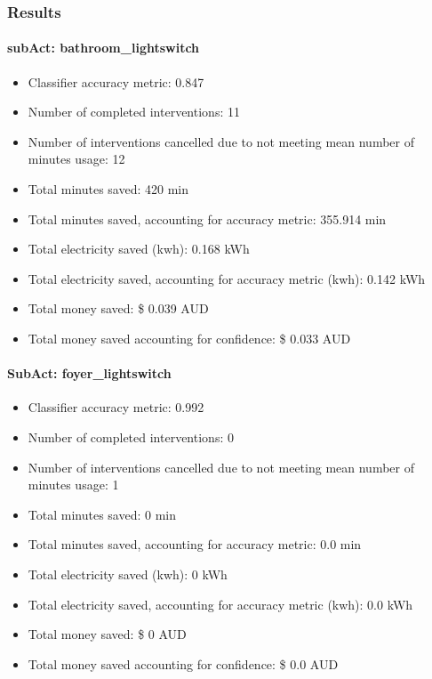 \documentclass[11pt,]{article}
\providecommand{\tightlist}{%
  \setlength{\itemsep}{0pt}\setlength{\parskip}{0pt}}
\let\oldparagraph\paragraph
\renewcommand{\paragraph}[1]{\oldparagraph{#1}\mbox{}}
\begin{document}
\hypertarget{results}{%
\subsubsection{Results}\label{results}}

\hypertarget{subact-bathroom_lightswitch}{%
\paragraph{subAct:
bathroom\_lightswitch}\label{subact-bathroom_lightswitch}}

\begin{itemize}
\tightlist
\item
  Classifier accuracy metric: 0.847
\item
  Number of completed interventions: 11
\item
  Number of interventions cancelled due to not meeting mean number of
  minutes usage: 12
\item
  Total minutes saved: 420 min
\item
  Total minutes saved, accounting for accuracy metric: 355.914 min
\item
  Total electricity saved (kwh): 0.168 kWh
\item
  Total electricity saved, accounting for accuracy metric (kwh): 0.142
  kWh
\item
  Total money saved: \$ 0.039 AUD
\item
  Total money saved accounting for confidence: \$ 0.033 AUD
\end{itemize}

\hypertarget{subact-foyer_lightswitch}{%
\paragraph{SubAct: foyer\_lightswitch}\label{subact-foyer_lightswitch}}

\begin{itemize}
\tightlist
\item
  Classifier accuracy metric: 0.992
\item
  Number of completed interventions: 0
\item
  Number of interventions cancelled due to not meeting mean number of
  minutes usage: 1
\item
  Total minutes saved: 0 min
\item
  Total minutes saved, accounting for accuracy metric: 0.0 min
\item
  Total electricity saved (kwh): 0 kWh
\item
  Total electricity saved, accounting for accuracy metric (kwh): 0.0 kWh
\item
  Total money saved: \$ 0 AUD
\item
  Total money saved accounting for confidence: \$ 0.0 AUD
\end{itemize}
\end{document}
